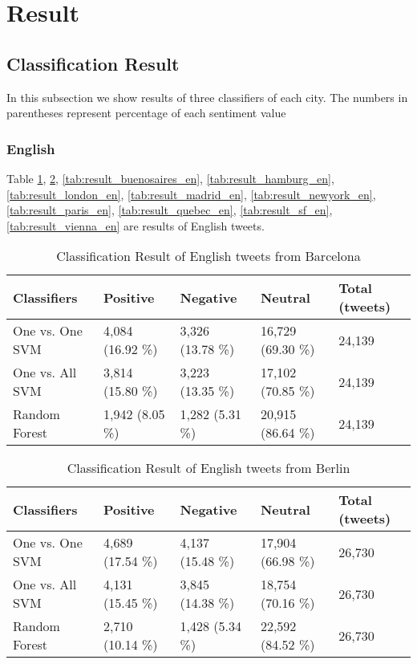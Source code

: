 \section{Result}\label{sec:result}
\subsection{Classification Result}
In this subsection we show results of three classifiers of each city.
The numbers in parentheses represent percentage of each sentiment value

\subsubsection{English}
Table \ref{tab:result_barcelona_en}, \ref{tab:result_berlin_en}, \ref{tab:result_buenosaires_en}, \ref{tab:result_hamburg_en}, \ref{tab:result_london_en}, \ref{tab:result_madrid_en}, \ref{tab:result_newyork_en}, \ref{tab:result_paris_en}, \ref{tab:result_quebec_en}, \ref{tab:result_sf_en}, \ref{tab:result_vienna_en} are results of English tweets.
\begin{table}[ht]
	\caption{Classification Result of English tweets from Barcelona}
	\begin{tabular}{|l|p{1.8cm}|p{1.8cm}|p{1.8cm}|p{1.8cm}|} \hline
	Classifiers & Positive & Negative & Neutral & Total (tweets)\\ \hline
	One vs. One SVM & 4,084 (16.92 \%) & 3,326 (13.78 \%) & 16,729 (69.30 \%) & 24,139\\ \hline
	One vs. All SVM & 3,814 (15.80 \%) & 3,223 (13.35 \%) & 17,102 (70.85 \%) & 24,139  \\ \hline
	Random Forest & 1,942 (8.05 \%) & 1,282 (5.31 \%) & 20,915 (86.64 \%) & 24,139 \\ \hline
	\end{tabular}
	\label{tab:result_barcelona_en}
\end{table}

\begin{table}[ht]
	\caption{Classification Result of English tweets from Berlin}
	\begin{tabular}{|l|p{1.8cm}|p{1.8cm}|p{1.8cm}|p{1.8cm}|} \hline
	Classifiers & Positive & Negative & Neutral & Total (tweets)\\ \hline
One vs. One SVM & 4,689 (17.54 \%) & 4,137 (15.48 \%)  & 17,904 (66.98 \%)& 26,730 \\ \hline
One vs. All SVM & 4,131 (15.45 \%) & 3,845 (14.38 \%) & 18,754 (70.16 \%) & 26,730 \\ \hline
Random Forest   & 2,710 (10.14 \%) & 1,428 (5.34 \%) & 22,592 (84.52 \%) & 26,730 \\ \hline
	\end{tabular}
	\label{tab:result_berlin_en}
\end{table}


